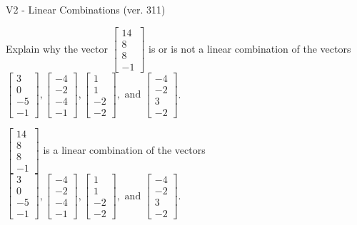 \begin{exercise}
  \begin{exerciseTitle}V2 - Linear Combinations (ver. 311)\end{exerciseTitle}
  \begin{exerciseStatement}
    Explain why the vector \(\left[\begin{array}{c}
14 \\
8 \\
8 \\
-1
\end{array}\right]\)  is or is not a linear 
	combination of the vectors \(\left[\begin{array}{c}
3 \\
0 \\
-5 \\
-1
\end{array}\right] , \left[\begin{array}{c}
-4 \\
-2 \\
-4 \\
-1
\end{array}\right] , \left[\begin{array}{c}
1 \\
1 \\
-2 \\
-2
\end{array}\right] , \text{ and } \left[\begin{array}{c}
-4 \\
-2 \\
3 \\
-2
\end{array}\right]\).
	


  \end{exerciseStatement}
  \begin{exerciseAnswer}
   \(\left[\begin{array}{c}
14 \\
8 \\
8 \\
-1
\end{array}\right]\) 
  	 is  
	a linear combination of the vectors \(\left[\begin{array}{c}
3 \\
0 \\
-5 \\
-1
\end{array}\right] , \left[\begin{array}{c}
-4 \\
-2 \\
-4 \\
-1
\end{array}\right] , \left[\begin{array}{c}
1 \\
1 \\
-2 \\
-2
\end{array}\right] , \text{ and } \left[\begin{array}{c}
-4 \\
-2 \\
3 \\
-2
\end{array}\right]\).


\end{exerciseAnswer}
\end{exercise}
